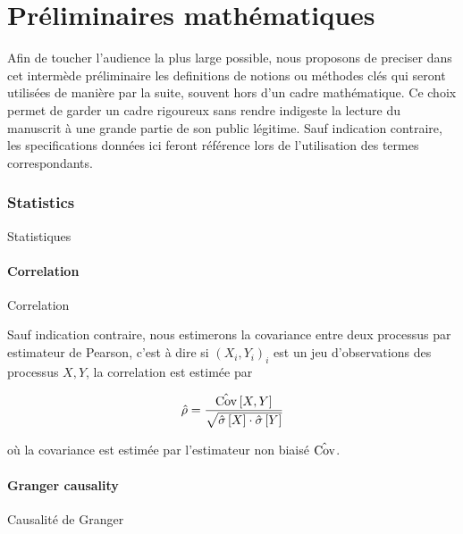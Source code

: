 \stars







\chapter*{Préliminaires mathématiques}





Afin de toucher l'audience la plus large possible, nous proposons de preciser dans cet intermède préliminaire les definitions de notions ou méthodes clés qui seront utilisées de manière par la suite, souvent hors d'un cadre mathématique. Ce choix permet de garder un cadre rigoureux sans rendre indigeste la lecture du manuscrit à une grande partie de son public légitime. Sauf indication contraire, les specifications données ici feront référence lors de l'utilisation des termes correspondants.



\subsection*{Statistics}{Statistiques}


\subsubsection*{Correlation}{Correlation}

Sauf indication contraire, nous estimerons la covariance entre deux processus par estimateur de Pearson, c'est à dire si $(X_i,Y_i)_i$ est un jeu d'observations des processus $X,Y$, la correlation est estimée par

\[
\hat{\rho} = \frac{\hat{\operatorname{Cov}}\left[X,Y\right]}{\sqrt{\hat{\sigma} \left[X\right] \cdot \hat{\sigma}\left[Y\right]}}
\]

où la covariance est estimée par l'estimateur non biaisé $\hat{\operatorname{Cov}}$.




\subsubsection*{Granger causality}{Causalité de Granger}


